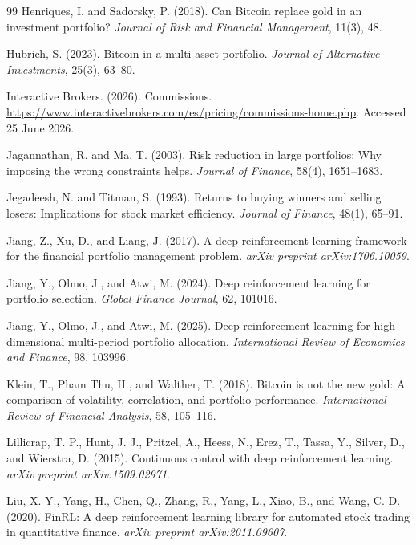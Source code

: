 \documentclass[12pt]{article}
\begin{document}
\begin{thebibliography}{99}
 Henriques, I. and Sadorsky, P. (2018). Can Bitcoin replace gold in an investment portfolio? \emph{Journal of Risk and Financial Management}, 11(3), 48.

 Hubrich, S. (2023). Bitcoin in a multi-asset portfolio. \emph{Journal of Alternative Investments}, 25(3), 63--80.

 Interactive Brokers. (2026). Commissions. \url{https://www.interactivebrokers.com/es/pricing/commissions-home.php}. Accessed 25 June 2026.

 Jagannathan, R. and Ma, T. (2003). Risk reduction in large portfolios: Why imposing the wrong constraints helps. \emph{Journal of Finance}, 58(4), 1651--1683.

 Jegadeesh, N. and Titman, S. (1993). Returns to buying winners and selling losers: Implications for stock market efficiency. \emph{Journal of Finance}, 48(1), 65--91.

 Jiang, Z., Xu, D., and Liang, J. (2017). A deep reinforcement learning framework for the financial portfolio management problem. \emph{arXiv preprint arXiv:1706.10059}.

 Jiang, Y., Olmo, J., and Atwi, M. (2024). Deep reinforcement learning for portfolio selection. \emph{Global Finance Journal}, 62, 101016.

 Jiang, Y., Olmo, J., and Atwi, M. (2025). Deep reinforcement learning for high-dimensional multi-period portfolio allocation. \emph{International Review of Economics and Finance}, 98, 103996.

 Klein, T., Pham Thu, H., and Walther, T. (2018). Bitcoin is not the new gold: A comparison of volatility, correlation, and portfolio performance. \emph{International Review of Financial Analysis}, 58, 105--116.

 Lillicrap, T. P., Hunt, J. J., Pritzel, A., Heess, N., Erez, T., Tassa, Y., Silver, D., and Wierstra, D. (2015). Continuous control with deep reinforcement learning. \emph{arXiv preprint arXiv:1509.02971}.

 Liu, X.-Y., Yang, H., Chen, Q., Zhang, R., Yang, L., Xiao, B., and Wang, C. D. (2020). FinRL: A deep reinforcement learning library for automated stock trading in quantitative finance. \emph{arXiv preprint arXiv:2011.09607}.


\end{thebibliography}
\end{document}
